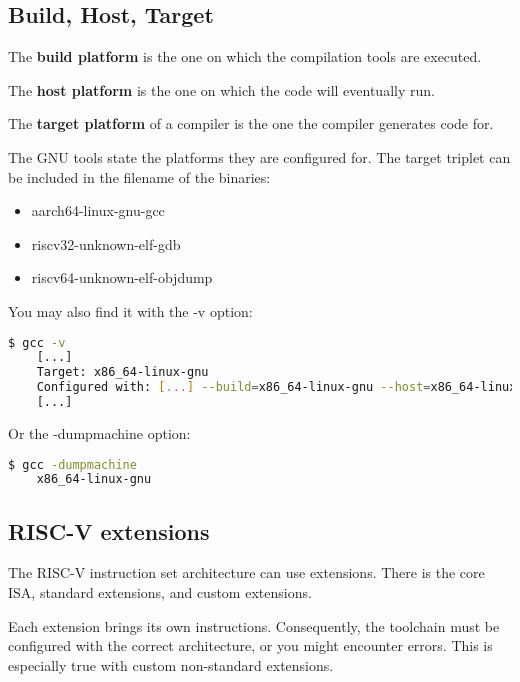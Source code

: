 \documentclass{article}
\begin{document}
	
	\subsection{Build, Host, Target}
	
	The \textbf{build platform} is the one on which the compilation tools are executed.
	
	The \textbf{host platform} is the one on which the code will eventually run.
	
	The \textbf{target platform} of a compiler is the one the compiler generates code for.
	
	The GNU tools state the platforms they are configured for. The target triplet can be included in the filename of the binaries:
	
	\vspace{-\topsep}
	\begin{itemize}
	\item aarch64-linux-gnu-gcc
	\item riscv32-unknown-elf-gdb
	\item riscv64-unknown-elf-objdump
	\end{itemize}
	
	You may also find it with the -v option:
	
	\begin{lstlisting}[language=bash]
    $ gcc -v
    [...]
    Target: x86_64-linux-gnu
    Configured with: [...] --build=x86_64-linux-gnu --host=x86_64-linux-gnu --target=x86_64-linux-gnu
    [...] 
    \end{lstlisting}
    
    Or the -dumpmachine option:
    
    \begin{lstlisting}[language=bash]
    $ gcc -dumpmachine
    x86_64-linux-gnu
    \end{lstlisting}
    
    \subsection{RISC-V extensions}
    
    The RISC-V instruction set architecture can use extensions. There is the core ISA, standard extensions, and custom extensions.
    
    Each extension brings its own instructions. Consequently, the toolchain must be configured with the correct architecture, or you might encounter errors. This is especially true with custom non-standard extensions.
    
\end{document}
